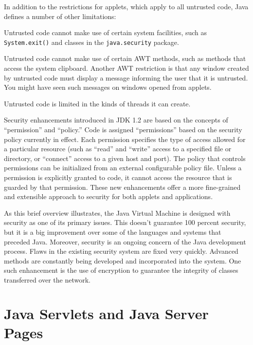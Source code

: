 In addition to the restrictions for applets, which
apply to all untrusted code, Java defines a number of
other limitations:

\begin{BL}
\item  Untrusted code cannot make use of certain system
facilities, such as {\tt System.exit()} and classes
in the {\tt java.security} package.

\item  Untrusted code cannot make use of certain AWT
methods, such as methods that access the system clipboard.   Another
AWT restriction is that any window created by untrusted code must
display a message informing the user that it is untrusted.  You might
have seen such messages on windows opened from applets.

\item  Untrusted code is limited in the kinds of threads
it can create.
\end{BL}

Security enhancements introduced in JDK 1.2 are based on the
concepts of ``permission'' and ``policy.'' Code is assigned
``permissions'' based on the security policy currently in effect.  Each
permission specifies the type of access allowed for a particular
resource (such as ``read'' and ``write'' access to a specified file or
directory, or ``connect'' access to a given host and port). The
policy that controls permissions can be initialized from an external
configurable policy file.  Unless a permission is explicitly granted to
code, it cannot access the resource that is guarded by that
permission.   These new enhancements offer a more fine-grained and
extensible approach to security for both applets and applications.

As this brief overview illustrates, the Java Virtual Machine is
designed with security as one of its primary issues.  This
doesn't guarantee 100 percent
security, but it is a big improvement over some of
the languages and systems that preceded Java.   Moreover, security is
an ongoing concern of the Java development process.   Flaws in the existing
security system are fixed very quickly.   Advanced methods are
constantly being developed and incorporated into the system.  One such
enhancement is the use of encryption to guarantee the integrity of
classes transferred over the network.

\section{Java Servlets and Java Server Pages}
\label{java-servletsand-java-server-pages}


